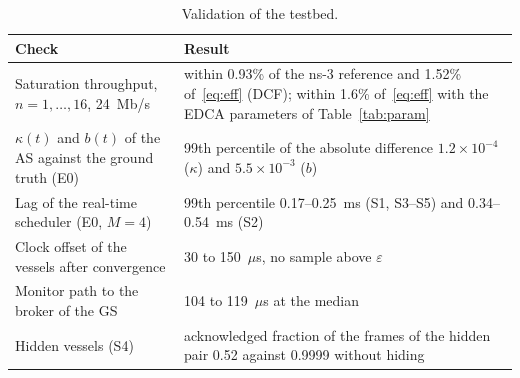 \begin{table}[t]
\caption{Validation of the testbed.}\label{tab:valid}
\centering\footnotesize
\begin{tabular}{@{}p{3.6cm}p{4.2cm}@{}}
\toprule
Check & Result \\
\midrule
Saturation throughput, $n = 1, \dots, 16$, 24~Mb/s & within 0.93\% of the ns-3 reference and 1.52\% of~\eqref{eq:eff} (DCF); within 1.6\% of~\eqref{eq:eff} with the EDCA parameters of Table~\ref{tab:param} \\
$\kappa(t)$ and $b(t)$ of the AS against the ground truth (E0) & 99th percentile of the absolute difference $1.2 \times 10^{-4}$ ($\kappa$) and $5.5 \times 10^{-3}$ ($b$) \\
Lag of the real-time scheduler (E0, $M = 4$) & 99th percentile 0.17--0.25~ms (S1, S3--S5) and 0.34--0.54~ms (S2) \\
Clock offset of the vessels after convergence & 30 to 150~$\mu$s, no sample above $\varepsilon$ \\
Monitor path to the broker of the GS & 104 to 119~$\mu$s at the median \\
Hidden vessels (S4) & acknowledged fraction of the frames of the hidden pair 0.52 against 0.9999 without hiding \\
\bottomrule
\end{tabular}
\end{table}
